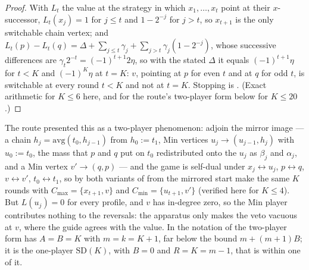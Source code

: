 \documentclass[11pt]{article}
\theoremstyle{plain}
\theoremstyle{definition}
\begin{document}
\begin{proof}
With $L_t$ the value at the strategy in which $x_1,\dots,x_t$ point at
their $x$-successor, $L_t(x_j)=1$ for $j\le t$ and $1-2^{-j}$ for $j>t$,
so $x_{t+1}$ is the only switchable chain vertex; and
$L_t(p)-L_t(q)=\Delta+\sum_{j\le t}\gamma_j+\sum_{j>t}\gamma_j(1-2^{-j})$,
whose successive differences are $\gamma_t2^{-t}=(-1)^{t+1}2\eta$, so
with the stated $\Delta$ it equals $(-1)^{t+1}\eta$ for $t<K$ and
$(-1)^{K}\eta$ at $t=K$: $v$, pointing at $p$ for even $t$ and at $q$ for
odd $t$, is switchable at every round $t<K$ and not at $t=K$. Stopping is
. (Exact arithmetic for $K\le6$ here, and for the
route's two-player form below for $K\le20$.)
\end{proof}

The route presented this as a two-player phenomenon: adjoin the mirror
image --- a chain $h_j=\mathrm{avg}(t_0,h_{j-1})$ from $h_0:=t_1$, Min
vertices $u_j\to(u_{j-1},h_j)$ with $u_0:=t_0$, the mass that $p$ and $q$
put on $t_0$ redistributed onto the $u_j$ as $\beta_j$ and $\alpha_j$, and
a Min vertex $v'\to(q,p)$ --- and the game is self-dual under
$x_j\leftrightarrow u_j$, $p\leftrightarrow q$, $v\leftrightarrow v'$,
$t_0\leftrightarrow t_1$, so by  both variants of
 from the mirrored start make the same $K$ rounds with
$C_{\max}=\{x_{t+1},v\}$ and $C_{\min}=\{u_{t+1},v'\}$ (verified here for
$K\le4$). But $L(u_j)=0$ for every profile, and $v$ has in-degree zero, so
the Min player contributes nothing to the reversals: the apparatus only
makes the veto vacuous at $v$, where the guide agrees with the value. In
the notation of  the two-player form has $A=B=K$
with $m=k=K+1$, far below the bound $m+(m+1)B$; it is the one-player
$\mathrm{SD}(K)$, with $B=0$ and $R=K=m-1$, that is within one of it.
\end{document}
